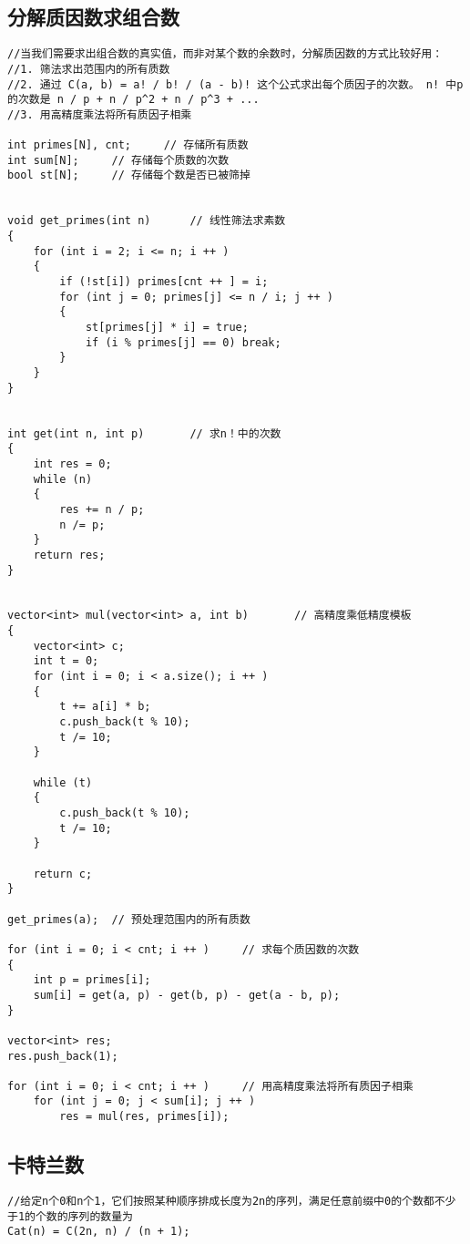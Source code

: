 \documentclass[12pt,a4paper,UTF16]{ctexbook}
\theoremstyle{plain}
\begin{document}
\subsection{分解质因数求组合数}
\begin{lstlisting}
//当我们需要求出组合数的真实值，而非对某个数的余数时，分解质因数的方式比较好用：
//1. 筛法求出范围内的所有质数
//2. 通过 C(a, b) = a! / b! / (a - b)! 这个公式求出每个质因子的次数。 n! 中p的次数是 n / p + n / p^2 + n / p^3 + ...
//3. 用高精度乘法将所有质因子相乘

int primes[N], cnt;     // 存储所有质数
int sum[N];     // 存储每个质数的次数
bool st[N];     // 存储每个数是否已被筛掉


void get_primes(int n)      // 线性筛法求素数
{
    for (int i = 2; i <= n; i ++ )
    {
        if (!st[i]) primes[cnt ++ ] = i;
        for (int j = 0; primes[j] <= n / i; j ++ )
        {
            st[primes[j] * i] = true;
            if (i % primes[j] == 0) break;
        }
    }
}


int get(int n, int p)       // 求n！中的次数
{
    int res = 0;
    while (n)
    {
        res += n / p;
        n /= p;
    }
    return res;
}


vector<int> mul(vector<int> a, int b)       // 高精度乘低精度模板
{
    vector<int> c;
    int t = 0;
    for (int i = 0; i < a.size(); i ++ )
    {
        t += a[i] * b;
        c.push_back(t % 10);
        t /= 10;
    }

    while (t)
    {
        c.push_back(t % 10);
        t /= 10;
    }

    return c;
}

get_primes(a);  // 预处理范围内的所有质数

for (int i = 0; i < cnt; i ++ )     // 求每个质因数的次数
{
    int p = primes[i];
    sum[i] = get(a, p) - get(b, p) - get(a - b, p);
}

vector<int> res;
res.push_back(1);

for (int i = 0; i < cnt; i ++ )     // 用高精度乘法将所有质因子相乘
    for (int j = 0; j < sum[i]; j ++ )
        res = mul(res, primes[i]);
\end{lstlisting}

\subsection{卡特兰数}
\begin{lstlisting}
//给定n个0和n个1，它们按照某种顺序排成长度为2n的序列，满足任意前缀中0的个数都不少于1的个数的序列的数量为
Cat(n) = C(2n, n) / (n + 1);
\end{lstlisting}
\end{document}
